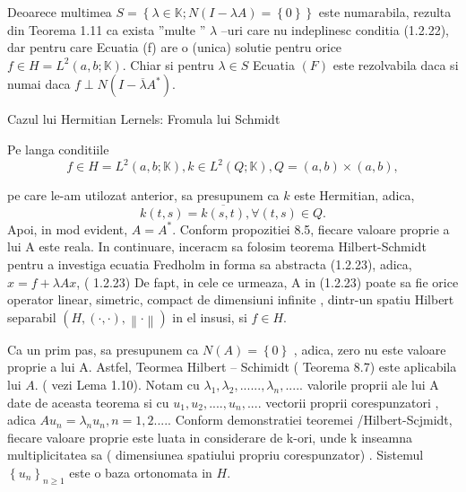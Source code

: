 \documentclass[a4paper,12pt,oneside]{report}
\begin{document}
	Deoarece multimea \(S = \left \{\lambda \in \mathbb{K} ; N\left ( I - \lambda A \right ) = \left \{ 0 \right \}\right \}\) este numarabila, rezulta din Teorema 1.11 ca exista ”multe ” \(\lambda\) –uri care nu indeplinesc conditia (1.2.22), dar  pentru care Ecuatia (f) are o (unica) solutie pentru orice \(f\in H = L^{2}\left ( a,b;\mathbb{K} \right )\). Chiar si pentru \(\lambda \in S\) Ecuatia \((F)\)  este rezolvabila daca si numai daca \(f \perp N\left ( I - \overline{\lambda }A^{\ast } \right )\). 
					
	Cazul lui Hermitian Lernels: Fromula lui Schmidt 
					
	Pe langa conditiile
	\begin{displaymath}
		f\in H = L^{2}\left ( a,b;\mathbb{K} \right ), k\in L^{2}\left ( Q;\mathbb{K} \right ), Q = \left ( a,b \right )\times \left ( a,b \right ), 
	\end{displaymath}
					
	pe care le-am utilozat anterior, sa presupunem ca \(k\) este Hermitian, adica, 
	\begin{displaymath}
		k\left ( t,s \right ) = \overline{k\left ( s,t \right )}, \forall \left ( t,s \right ) \in Q.
	\end{displaymath}
	Apoi, in mod evident, \(A = A^{\ast }\). Conform propozitiei 8.5, fiecare valoare proprie a lui A este reala. 
	In continuare, inceracm sa folosim teorema Hilbert-Schmidt pentru a investiga ecuatia Fredholm in forma sa abstracta (1.2.23), adica, 
	\(x = f + \lambda Ax\), ( 1.2.23)
	De fapt, in cele ce urmeaza, A in (1.2.23) poate sa fie orice operator linear, simetric, compact de dimensiuni infinite , dintr-un spatiu Hilbert separabil \(\left ( H, \left ( \cdot ,\cdot  \right ), \left \| \cdot  \right \| \right )\) in el insusi, si \(f \in H\). 
					
	Ca un prim pas, sa presupunem ca \(N\left ( A  \right ) = \left \{ 0 \right \}\) , adica, zero nu este valoare proprie a lui A. Astfel, Teormea Hilbert – Schimidt ( Teorema 8.7) este aplicabila lui \(A\). ( vezi Lema 1.10). Notam cu \(\lambda _{1}, \lambda _{2}, ......,\lambda _{n},.....\) valorile proprii ale lui A date de aceasta teorema si cu \(u_{1},u_{2},....,u_{n},....\) vectorii proprii corespunzatori , adica \(Au_{n} = \lambda_{n}u_{n}, n = 1,2....\). Conform demonstratiei teoremei /Hilbert-Scjmidt, fiecare valoare proprie este luata in considerare de k-ori, unde k inseamna multiplicitatea sa ( dimensiunea spatiului propriu corespunzator) . Sistemul \(\left \{ u_{n} \right \}_{n\geq 1}\) este o baza ortonomata in \(H\). 
					
\end{document}
